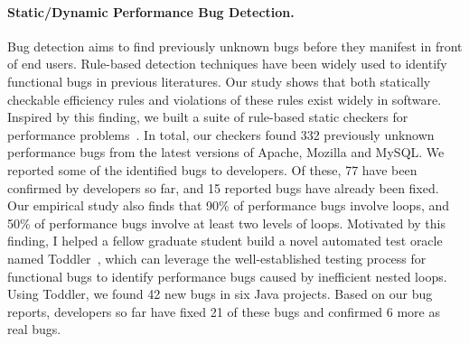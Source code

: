 \documentclass[10pt]{article}
\begin{document}
\paragraph{Static/Dynamic Performance Bug Detection.}
Bug detection aims to find previously unknown bugs
before they manifest in front of end users. 
Rule-based detection techniques have been widely used to identify 
functional bugs in previous literatures.
Our study shows that both statically checkable efficiency rules 
and violations of these rules exist widely in software. 
Inspired by this finding,
we built a suite of rule-based static checkers for performance problems~\cite{jin12perfbug}.
In total, our checkers found 332 previously unknown performance bugs 
from the latest versions of Apache, Mozilla and MySQL. 
We reported some of the identified bugs to developers. 
Of these, 77 have been confirmed by developers so far, 
and 15 reported bugs have already been fixed.
Our empirical study also finds that 90\% of performance bugs involve loops, 
and 50\% of performance bugs involve at least two levels of loops. 
Motivated by this finding, I helped a fellow graduate student 
build a novel automated test oracle named Toddler~\cite{Nistor13ICSE},
which can leverage the well-established testing process for functional bugs to 
identify performance bugs caused by inefficient nested loops. 
Using Toddler, we found 42 new bugs in six Java projects.
Based on our bug reports, developers so far have fixed 21 of these bugs 
and confirmed 6 more as real bugs. 

\vspace{-.1in}
\end{document}
